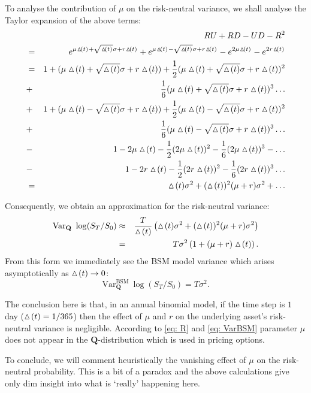 \documentclass{amsart}
\theoremstyle{definition}
\theoremstyle{remark}
\numberwithin{equation}{section}
\newcommand{\1}{\boldsymbol{1}}
\begin{document}
To analyse the contribution of $\mu$ on the risk-neutral variance, we shall analyse the Taylor expansion of the above terms:
\begin{eqnarray*}
&&RU + RD - UD - R^2\\ 
&=&  e^{\mu \t + \sqrt{\t}\sigma + r\t } + e^{\mu \t - \sqrt{\t}\sigma + r\t } - 
e^{2\mu \t} - e^{2r\t}\\
&=& 1+ (\mu \t + \sqrt{\t}\sigma + r\t ) +\frac{1}{2} (\mu \t + \sqrt{\t}\sigma + r\t )^2\\ 
&+& \frac{1}{6} (\mu \t + \sqrt{\t}\sigma + r\t )^3  \ldots\\
&+& 1+ (\mu \t - \sqrt{\t}\sigma + r\t ) +\frac{1}{2} (\mu \t - \sqrt{\t}\sigma + r\t )^2\\ 
&+& \frac{1}{6} (\mu \t - \sqrt{\t}\sigma + r\t )^3 \ldots\\
&-&  1 - 2\mu \t  - \frac{1}{2}( 2\mu \t )^2  -\frac{1}{6}( 2\mu \t )^3  - \ldots \\
&-&  1 - 2r \t - \frac{1}{2}( 2r \t )^2  - \frac{1}{6}( 2r \t )^3 \ldots \\
&=& \t \sigma^2  + (\t)^2 (\mu + r) \sigma^2 + \ldots
\end{eqnarray*}

Consequently, we obtain an approximation for the risk-neutral variance:
\begin{eqnarray*}
\mathrm{Var}_\mathbf{Q}\ \log(S_T / S_0 )&\approx& \frac{T}{\t}\left(\t \sigma^2 + (\t)^2 (\mu + r) \sigma^2 \right)\\
&=& T \sigma^2 \left(1  + (\mu + r) \t\right) .
\end{eqnarray*}
From this form we immediately see the BSM model variance which arises asymptotically as $\ \!\! \vartriangle\! (t)\ \!\! \to 0$:
\begin{equation}\label{eq: VarBSM}
\mathrm{Var}^{\mathrm{BSM}}_\mathbf{Q}\ \log(S_T / S_0 ) = T \sigma^2.
\end{equation}

The conclusion here is that, in an annual binomial model, if the time step is $1$ day ($\ \!\! \vartriangle\! (t)\ \!\!=1/365$) then the effect of $\mu$ and $r$ on the underlying asset's risk-neutral variance is negligible.
According to \eqref{eq: R} and \eqref{eq: VarBSM} parameter $\mu$ does not appear in the $\mathbf{Q}$-distribution which is used in pricing options.

To conclude, we will comment heuristically the vanishing effect of $\mu$ on the risk-neutral probability. 
This is a bit of a paradox and the above calculations give only dim insight into what is `really' happening here. 
\end{document}
